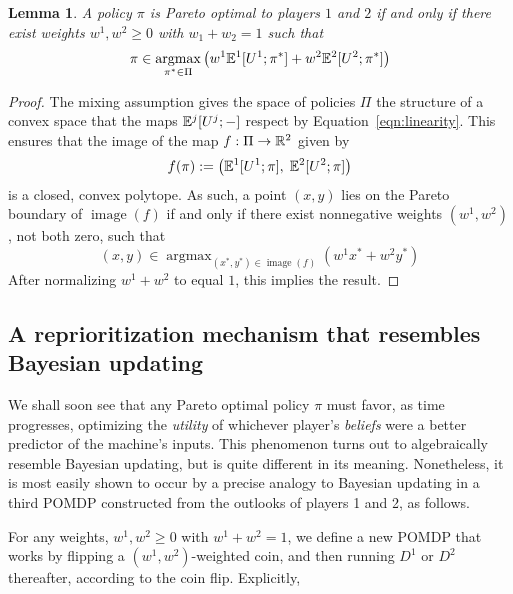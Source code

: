 \documentclass{article}  %
\newcommand{\eqn}[1]{Equation~\ref{eqn:#1}}
\DeclareMathOperator*{\argmax}{argmax}
\DeclareMathOperator{\image}{image}
\newtheorem{lemma}[theorem]{Lemma}
\begin{document}
\begin{lemma}\label{lem:pareto}
A policy $\pi$ is Pareto optimal to players $1$ and $2$ if and only if there exist weights $w^1,w^2\geq 0$ with $w_1+w_2=1$ such that
\begin{equation}\label{eqn:pareto}
\pi \in \argmax_{\pi^* \in\Pi}\left(w^1\EE^1[U^1;\pi^*] + w^2\EE^2[U^2; \pi^*]\right)
\end{equation}
\end{lemma}

\begin{proof}
The mixing assumption gives the space of policies $\Pi$ the structure of a convex space that the maps $\mathbb{E}^j[U^j; -] $ respect by \eqn{linearity}.  This ensures that the image of the map $f:\Pi\to\mathbb{R}^2$ given by
\[
f(\pi) := \left(\mathbb{E}^1[U^1;\pi],\; \mathbb{E}^2[U^2;\pi]\right)
\]
is a closed, convex polytope.  As such, a point $(x,y)$ lies on the Pareto boundary of $\image(f)$ if and only if there exist nonnegative weights $(w^1,w^2)$, not both zero, such that 
\[
(x,y) \in \argmax_{(x^*,y^*)\in \image(f)} \left(w^1x^* + w^2y^*\right)
\]
After normalizing $w^1+w^2$ to equal $1$, this implies the result.
\end{proof}

\subsection{A reprioritization mechanism that resembles Bayesian updating}

We shall soon see that any Pareto optimal policy $\pi$ must favor, as time progresses, optimizing the \emph{utility} of whichever player's \emph{beliefs} were a better predictor of the machine's inputs.  This phenomenon turns out to algebraically resemble Bayesian updating, but is quite different in its meaning.  Nonetheless, it is most easily shown to occur by a precise analogy to Bayesian updating in a third POMDP constructed from the outlooks of players 1 and 2, as follows.

For any weights, $w^1,w^2\ge 0$ with $w^1+w^2=1$, we define a new POMDP that works by flipping a $(w^1,w^2)$-weighted coin, and then running $D^1$ or $D^2$ thereafter, according to the coin flip.  Explicitly, 
\end{document}
